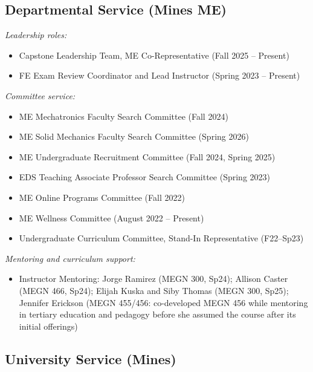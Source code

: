 \documentclass[11pt,letterpaper]{article}
\begin{document}
\subsection{Departmental Service (Mines ME)}

\noindent\textit{Leadership roles:}
\begin{itemize}
  \item Capstone Leadership Team, ME Co-Representative (Fall 2025 -- Present)
  \item FE Exam Review Coordinator and Lead Instructor (Spring 2023 -- Present)
\end{itemize}

\noindent\textit{Committee service:}
\begin{itemize}
  \item ME Mechatronics Faculty Search Committee (Fall 2024)
  \item ME Solid Mechanics Faculty Search Committee (Spring 2026)
  \item ME Undergraduate Recruitment Committee (Fall 2024, Spring 2025)
  \item EDS Teaching Associate Professor Search Committee (Spring 2023)
  \item ME Online Programs Committee (Fall 2022)
  \item ME Wellness Committee (August 2022 -- Present)
  \item Undergraduate Curriculum Committee, Stand-In Representative (F22--Sp23)
\end{itemize}

\noindent\textit{Mentoring and curriculum support:}
\begin{itemize}
  \item Instructor Mentoring: Jorge Ramirez (MEGN 300, Sp24); Allison Caster
        (MEGN 466, Sp24); Elijah Kuska and Siby Thomas (MEGN 300, Sp25);
        Jennifer Erickson (MEGN 455/456: co-developed MEGN 456 while mentoring in
        tertiary education and pedagogy before she assumed the course after its
        initial offerings)
\end{itemize}

\subsection{University Service (Mines)}
\end{document}
